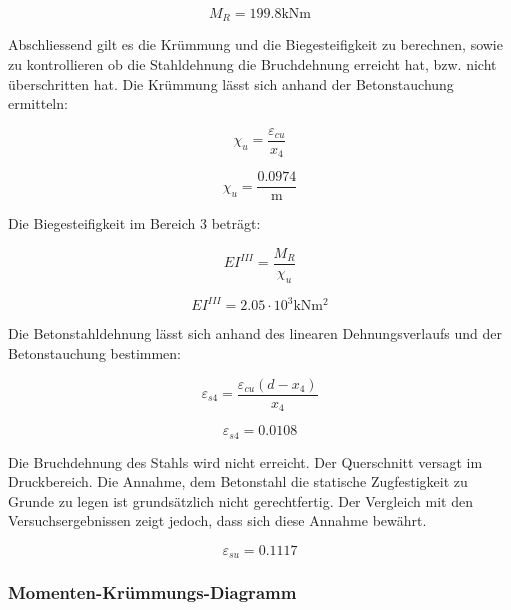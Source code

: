\documentclass[
  12pt,
  letterpaper,
  egregdoesnotlikesansseriftitles]{scrreprt}
\begin{document}
\begin{equation}M_{R} = 199.8 \text{kN} \text{m}\end{equation}

Abschliessend gilt es die Krümmung und die Biegesteifigkeit zu
berechnen, sowie zu kontrollieren ob die Stahldehnung die Bruchdehnung
erreicht hat, bzw. nicht überschritten hat. Die Krümmung lässt sich
anhand der Betonstauchung ermitteln:

\begin{equation}\chi_{u} = \frac{\varepsilon_{cu}}{x_{4}}\end{equation}

\begin{equation}\chi_{u} = \frac{0.0974}{\text{m}}\end{equation}

Die Biegesteifigkeit im Bereich 3 beträgt:

\begin{equation}EI^{III} = \frac{M_{R}}{\chi_{u}}\end{equation}

\begin{equation}EI^{III} = 2.05 \cdot 10^{3} \text{kN} \text{m}^{2}\end{equation}

Die Betonstahldehnung lässt sich anhand des linearen Dehnungsverlaufs
und der Betonstauchung bestimmen:

\begin{equation}\varepsilon_{s4} = \frac{\varepsilon_{cu} \left(d - x_{4}\right)}{x_{4}}\end{equation}

\begin{equation}\varepsilon_{s4} = 0.0108\end{equation}

Die Bruchdehnung des Stahls wird nicht erreicht. Der Querschnitt versagt
im Druckbereich. Die Annahme, dem Betonstahl die statische Zugfestigkeit
zu Grunde zu legen ist grundsätzlich nicht gerechtfertig. Der Vergleich
mit den Versuchsergebnissen zeigt jedoch, dass sich diese Annahme
bewährt.

\begin{equation}\varepsilon_{su} = 0.1117\end{equation}

\hypertarget{momenten-kruxfcmmungs-diagramm}{%
\subsubsection{Momenten-Krümmungs-Diagramm}\label{momenten-kruxfcmmungs-diagramm}}
\end{document}
